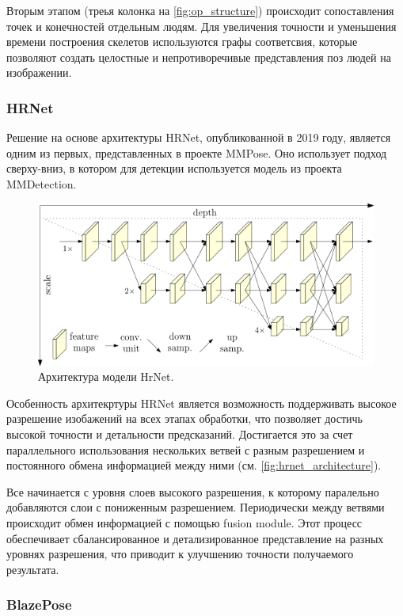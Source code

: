 Вторым этапом (треья колонка на \autoref{fig:op_structure}) происходит сопоставления точек и конечностей отдельным людям. Для увеличения точности и уменьшения времени построения скелетов используются графы соответсвия, которые позволяют создать целостные и непротиворечивые представления поз людей на изображении.

\subsubsection*{HRNet}

Решение на основе архитектуры HRNet, опубликованной в 2019 году, является одним из первых, представленных в проекте MMPose. Оно использует подход сверху-вниз, в котором для детекции используется модель из проекта MMDetection.

\begin{figure}[h]
	\centering
	\includegraphics[width=.8\textwidth]{./images/hrnet_architecture}
	\caption{Архитектура модели HrNet. \cite{hrnet}}
	\label{fig:hrnet_architecture}
\end{figure}

Особенность архитекртуры HRNet является возможность поддерживать высокое разрешение изобажений на всех этапах обработки, что позволяет достичь высокой точности и детальности предсказаний. Достигается это за счет параллельного использования нескольких ветвей с разным разрешением и постоянного обмена информацией между ними (см. \autoref{fig:hrnet_architecture}).

Все начинается с уровня слоев высокого разрешения, к которому паралельно добавляются слои с пониженным разрешением. Периодически между ветвями происходит обмен  информацией с помощью fusion module. Этот процесс обеспечивает сбалансированное и детализированное представление на разных уровнях разрешения, что приводит к улучшению точности получаемого результата.

\subsubsection*{BlazePose}

